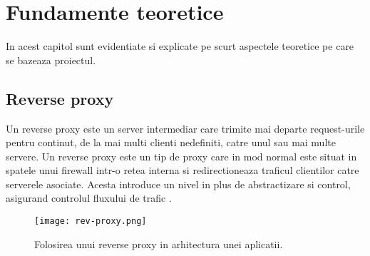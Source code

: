 \chapter{Fundamente teoretice}
\label{cap:fund-teoretice}


In acest capitol sunt evidentiate si explicate pe scurt aspectele teoretice pe care se bazeaza proiectul.

%
%
%
%
\section{Reverse proxy}

Un reverse proxy este un server intermediar care trimite mai departe request-urile pentru continut, de la mai multi clienti nedefiniti, catre unul sau mai multe servere. Un reverse proxy este un tip de proxy care in mod normal este situat in spatele unui firewall intr-o retea interna si redirectioneaza traficul clientilor catre serverele asociate. Acesta introduce un nivel in plus de abstractizare si control, asigurand controlul fluxului de trafic \cite{rev_proxy_server}.

\begin{figure}[h]
	\centering
	\texttt{[image: rev-proxy.png]}
	\caption{Folosirea unui reverse proxy in arhitectura unei aplicatii.}
	\label{fig:rev-proxy}
\end{figure}

